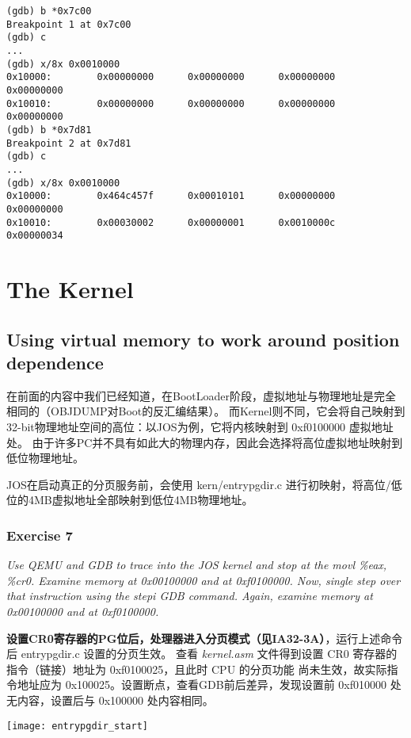 \documentclass[12pt, letterpaper]{report}
\begin{document}
\lstset{style=AssemblyStyle}
\setmainfont{Consolas}
\begin{lstlisting}
(gdb) b *0x7c00
Breakpoint 1 at 0x7c00
(gdb) c
...  
(gdb) x/8x 0x0010000
0x10000:        0x00000000      0x00000000      0x00000000      0x00000000
0x10010:        0x00000000      0x00000000      0x00000000      0x00000000
(gdb) b *0x7d81
Breakpoint 2 at 0x7d81
(gdb) c
...
(gdb) x/8x 0x0010000
0x10000:        0x464c457f      0x00010101      0x00000000      0x00000000
0x10010:        0x00030002      0x00000001      0x0010000c      0x00000034
\end{lstlisting}
\setmainfont{Times New Roman}

\chapter[\Large The Kernel]{The Kernel}
\section[\large Using virtual memory to work around position dependence]{Using virtual memory to work around position dependence}
在前面的内容中我们已经知道，在BootLoader阶段，虚拟地址与物理地址是完全相同的（OBJDUMP对Boot的反汇编结果）。
而Kernel则不同，它会将自己映射到32-bit物理地址空间的高位：以JOS为例，它将内核映射到 0xf0100000 虚拟地址处。
由于许多PC并不具有如此大的物理内存，因此会选择将高位虚拟地址映射到低位物理地址。 \par 
JOS在启动真正的分页服务前，会使用 kern/entrypgdir.c 进行初映射，将高位/低位的4MB虚拟地址全部映射到低位4MB物理地址。

\subsection{\large Exercise 7}
\textsl{Use QEMU and GDB to trace into the JOS kernel and stop at the movl \%eax, \%cr0. 
        Examine memory at 0x00100000 and at 0xf0100000. Now, single step over that instruction 
        using the stepi GDB command. Again, examine memory at 0x00100000 and at 0xf0100000.} \par 
\quad \par
\textbf{设置CR0寄存器的PG位后，处理器进入分页模式（见IA32-3A）}，运行上述命令后 entrypgdir.c 设置的分页生效。
查看 \textsl{kernel.asm} 文件得到设置 CR0 寄存器的指令（链接）地址为 0xf0100025，且此时 CPU 的分页功能
尚未生效，故实际指令地址应为 0x100025。设置断点，查看GDB前后差异，发现设置前 0xf010000 处无内容，设置后与 0x100000 
处内容相同。 \par
\quad \par
\texttt{[image: entrypgdir\_start]} \par
\end{document}
